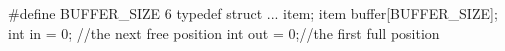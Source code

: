 \documentclass[varwidth=19.2em,crop]{standalone}
\begin{document}
\begin{ccode}
#define BUFFER_SIZE 6
typedef struct {
  ...
} item;
item buffer[BUFFER_SIZE];
int in = 0; //the next free position
int out = 0;//the first full position
\end{ccode}
\end{document}
